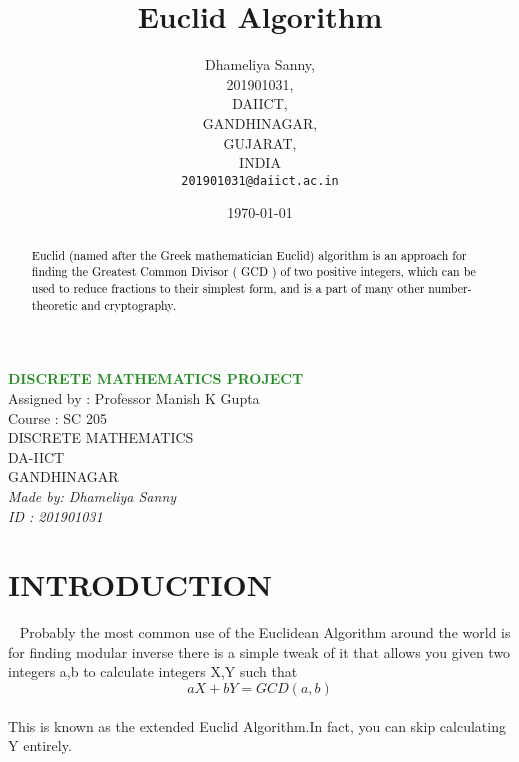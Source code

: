 \documentclass[12pt]{article}
\begin{document}
\title{\textcolor{BurntOrange}{ Euclid Algorithm }}

\begin{center}
\huge
{\bf \textcolor{ForestGreen}{
{  DISCRETE MATHEMATICS PROJECT }       \\
}
}
\vspace{2 cm}
\huge
{ Assigned by : Professor Manish K Gupta  \\
  Course      : SC 205   \\
  DISCRETE MATHEMATICS \\
  DA-IICT      \\
  GANDHINAGAR  \\
}
\vspace{5 cm}
\LARGE {\it
{
  Made by: Dhameliya Sanny\\
  ID  : 201901031\\
}
}
\end{center}
\author{
         Dhameliya Sanny,\\
         201901031,\\
         DAIICT,\\
         GANDHINAGAR,\\
         GUJARAT,\\
         INDIA\\
         \texttt{201901031@daiict.ac.in}
      }  %

\date{\today}
\maketitle


\begin{abstract}
\textcolor{black}
{
\large
{
Euclid (named after the Greek mathematician
Euclid) algorithm is an approach for finding the
Greatest Common Divisor ( GCD ) of two
positive integers, which can be used to reduce
fractions to their simplest form, and is a part of
many other number-theoretic and cryptography.
}
}
\end{abstract}
\newpage
\large
\section{\textcolor{BurntOrange}{INTRODUCTION}} ~\cite{1}
\textsf
Probably the most common use of the Euclidean Algorithm around the world is for finding modular inverse there is a simple tweak of it that allows you given two integers a,b to calculate integers X,Y such that
   \[ aX + bY = GCD(a,b) \] \\
This is known as the extended Euclid Algorithm.In fact, you can skip calculating
Y entirely.
\\\\
\end{document}
